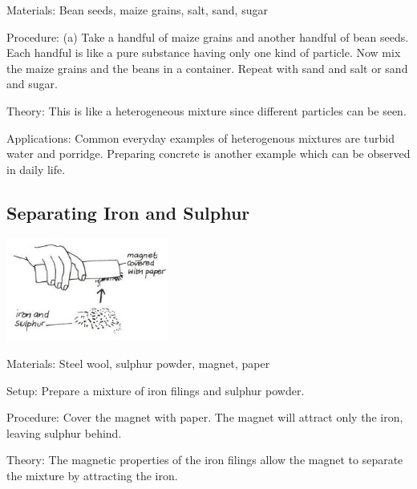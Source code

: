 \begin{multicols}{2}
\begin{description*}
\item[Materials:]{Bean seeds, maize grains, salt, sand, sugar}
\item[Procedure:]{(a) Take a handful of maize grains and
another handful of bean seeds. Each handful is
like a pure substance having only one kind of
particle. Now mix the maize grains and the
beans in a container. 
Repeat with sand and salt or sand and sugar.}
\item[Theory:]{This is like a heterogeneous
mixture since different particles can be seen.}
\item[Applications:]{Common everyday examples of
heterogenous mixtures are turbid water and
porridge. Preparing concrete is another example which can be observed in daily life.}
\end{description*}

\subsection{Separating Iron and Sulphur} %

\begin{center}
\includegraphics[width=0.4\textwidth]{./img/vso/iron-sulphur.jpg}
\end{center}

\begin{description*}
\item[Materials:]{Steel wool, sulphur powder, magnet, paper}
\item[Setup:]{Prepare a mixture of iron filings and sulphur powder.}
\item[Procedure:]{Cover the magnet with paper.
The magnet will attract only the
iron, leaving sulphur behind.}
\item[Theory:]{The magnetic properties of the iron filings allow the magnet to separate the mixture by attracting the iron.}
\end{description*}


\end{multicols}
